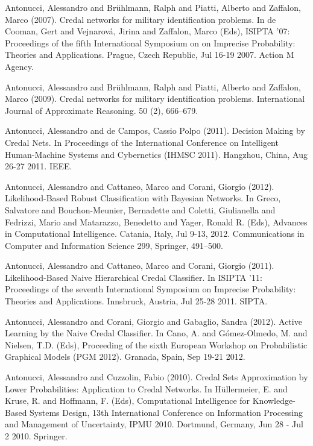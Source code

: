 \begin{cventries}
\begin{cvitems}
\item Antonucci, Alessandro and Brühlmann, Ralph and Piatti, Alberto and Zaffalon, Marco (2007).   Credal networks for military identification problems.   In de Cooman, Gert and Vejnarová, Jirina and Zaffalon, Marco (Eds), ISIPTA ’07: Proceedings of the fifth International Symposium on on Imprecise Probability: Theories and Applications.   Prague, Czech Republic,   Jul 16-19 2007.   Action M Agency.
\item Antonucci, Alessandro and Brühlmann, Ralph and Piatti, Alberto and Zaffalon, Marco (2009).   Credal networks for military identification problems.   International Journal of Approximate Reasoning. 50 (2), 666–679.
\item Antonucci, Alessandro and de Campos, Cassio Polpo (2011).   Decision Making by Credal Nets.   In Proceedings of the International Conference on Intelligent Human-Machine Systems and Cybernetics (IHMSC 2011).   Hangzhou, China,   Aug 26-27 2011.   IEEE.
\item Antonucci, Alessandro and Cattaneo, Marco and Corani, Giorgio (2012).   Likelihood-Based Robust Classification with Bayesian Networks.   In Greco, Salvatore and Bouchon-Meunier, Bernadette and Coletti, Giulianella and Fedrizzi, Mario and Matarazzo, Benedetto and Yager, Ronald R. (Eds), Advances in Computational Intelligence.   Catania, Italy, Jul 9-13, 2012.   Communications in Computer and Information Science 299, Springer, 491–500.
\item Antonucci, Alessandro and Cattaneo, Marco and Corani, Giorgio (2011).   Likelihood-Based Naive Hierarchical Credal Classifier.   In ISIPTA ’11: Proceedings of the seventh International Symposium on Imprecise Probability: Theories and Applications.   Innsbruck, Austria,   Jul 25-28 2011.   SIPTA.
\item Antonucci, Alessandro and Corani, Giorgio and Gabaglio, Sandra (2012).   Active Learning by the Naive Credal Classifier.   In Cano, A. and Gómez-Olmedo, M. and Nielsen, T.D. (Eds), Proceeding of the sixth European Workshop on Probabilistic Graphical Models (PGM 2012).   Granada, Spain,   Sep 19-21 2012.
\item Antonucci, Alessandro and Cuzzolin, Fabio (2010).   Credal Sets Approximation by Lower Probabilities: Application to Credal Networks.   In Hüllermeier, E. and Kruse, R. and Hoffmann, F. (Eds), Computational Intelligence for Knowledge-Based Systems Design, 13th International Conference on Information Processing and Management of Uncertainty, IPMU 2010.   Dortmund, Germany,   Jun 28 - Jul 2 2010.   Springer.

\end{cvitems}
\end{cventries}
